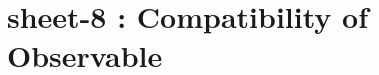 \chapter{sheet-8 : Compatibility of Observable}

\ifpdf
\graphicspath{{Chapter8/figs/}}
\else
\graphicspath{{Chapter8/figs/}}
\fi



